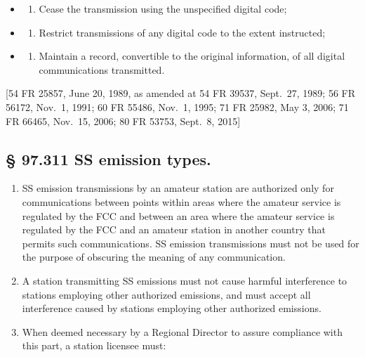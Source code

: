 \documentclass[
  letterpaper,
  DIV=11,
  numbers=noendperiod]{scrreport}
\providecommand{\tightlist}{%
  \setlength{\itemsep}{0pt}\setlength{\parskip}{0pt}}\usepackage{longtable,booktabs,array}
\begin{document}
\begin{itemize}
\item
  \begin{enumerate}
  \def\labelenumi{(\arabic{enumi})}
  \tightlist
  \item
    Cease the transmission using the unspecified digital code;
  \end{enumerate}
\item
  \begin{enumerate}
  \def\labelenumi{(\arabic{enumi})}
  \setcounter{enumi}{1}
  \tightlist
  \item
    Restrict transmissions of any digital code to the extent instructed;
  \end{enumerate}
\item
  \begin{enumerate}
  \def\labelenumi{(\arabic{enumi})}
  \setcounter{enumi}{2}
  \tightlist
  \item
    Maintain a record, convertible to the original information, of all
    digital communications transmitted.
  \end{enumerate}
\end{itemize}

{[}54 FR 25857, June 20, 1989, as amended at 54 FR 39537, Sept.~27,
1989; 56 FR 56172, Nov.~1, 1991; 60 FR 55486, Nov.~1, 1995; 71 FR 25982,
May 3, 2006; 71 FR 66465, Nov.~15, 2006; 80 FR 53753, Sept.~8, 2015{]}

\hypertarget{97.311}{%
\subsection*{§ 97.311 SS emission types.}\label{97.311}}

\begin{enumerate}
\def\labelenumi{(\alph{enumi})}
\item
  SS emission transmissions by an amateur station are authorized only
  for communications between points within areas where the amateur
  service is regulated by the FCC and between an area where the amateur
  service is regulated by the FCC and an amateur station in another
  country that permits such communications. SS emission transmissions
  must not be used for the purpose of obscuring the meaning of any
  communication.
\item
  A station transmitting SS emissions must not cause harmful
  interference to stations employing other authorized emissions, and
  must accept all interference caused by stations employing other
  authorized emissions.
\item
  When deemed necessary by a Regional Director to assure compliance with
  this part, a station licensee must:
\end{enumerate}
\end{document}
